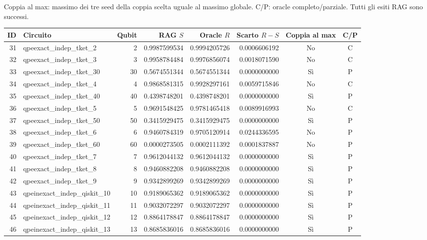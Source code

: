 \documentclass[10pt,a4paper,landscape]{article}
\begin{document}
\small Coppia al max: massimo dei tre seed della coppia scelta uguale al massimo globale.
C/P: oracle completo/parziale. Tutti gli esiti RAG sono successi.
\par\vspace{2mm}
{\fontsize{8.5}{10}\selectfont\setlength{\tabcolsep}{5pt}\renewcommand{\arraystretch}{1.18}

\begin{tabular}{rlrrrrcc}
\toprule
ID & Circuito & Qubit & RAG $S$ & Oracle $R$ & Scarto $R-S$ & Coppia al max & C/P \\
\midrule
31 & qpeexact\_indep\_tket\_2 & 2 & 0.9987599534 & 0.9994205726 & 0.0006606192 & No & C \\
32 & qpeexact\_indep\_tket\_3 & 3 & 0.9958784484 & 0.9976856074 & 0.0018071590 & No & C \\
33 & qpeexact\_indep\_tket\_30 & 30 & 0.5674551344 & 0.5674551344 & 0.0000000000 & Sì & P \\
34 & qpeexact\_indep\_tket\_4 & 4 & 0.9868581315 & 0.9928297161 & 0.0059715846 & No & C \\
35 & qpeexact\_indep\_tket\_40 & 40 & 0.4398748201 & 0.4398748201 & 0.0000000000 & Sì & P \\
36 & qpeexact\_indep\_tket\_5 & 5 & 0.9691548425 & 0.9781465418 & 0.0089916993 & No & C \\
37 & qpeexact\_indep\_tket\_50 & 50 & 0.3415929475 & 0.3415929475 & 0.0000000000 & Sì & P \\
38 & qpeexact\_indep\_tket\_6 & 6 & 0.9460784319 & 0.9705120914 & 0.0244336595 & No & P \\
39 & qpeexact\_indep\_tket\_60 & 60 & 0.0000273505 & 0.0002111392 & 0.0001837887 & No & P \\
40 & qpeexact\_indep\_tket\_7 & 7 & 0.9612044132 & 0.9612044132 & 0.0000000000 & Sì & P \\
41 & qpeexact\_indep\_tket\_8 & 8 & 0.9460882208 & 0.9460882208 & 0.0000000000 & Sì & P \\
42 & qpeexact\_indep\_tket\_9 & 9 & 0.9342899269 & 0.9342899269 & 0.0000000000 & Sì & P \\
43 & qpeinexact\_indep\_qiskit\_10 & 10 & 0.9189065362 & 0.9189065362 & 0.0000000000 & Sì & P \\
44 & qpeinexact\_indep\_qiskit\_11 & 11 & 0.9032072297 & 0.9032072297 & 0.0000000000 & Sì & P \\
45 & qpeinexact\_indep\_qiskit\_12 & 12 & 0.8864178847 & 0.8864178847 & 0.0000000000 & Sì & P \\
46 & qpeinexact\_indep\_qiskit\_13 & 13 & 0.8685836016 & 0.8685836016 & 0.0000000000 & Sì & P \\

\end{tabular}}
\end{document}
